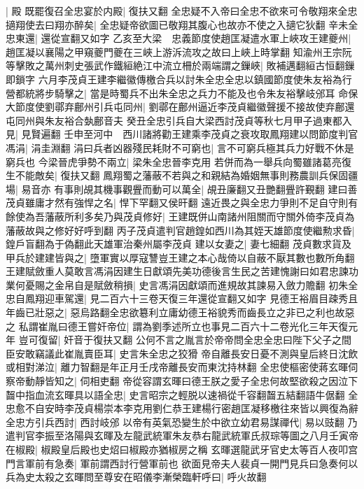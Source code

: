 |{
	殿}
既罷復召全忠宴於内殿|{
	復扶又翻}
全忠疑不入帝曰全忠不欲來可令敬翔來全忠擿翔使去曰翔亦醉矣|{
	全忠疑帝欲圖已敬翔其腹心也故亦不使之入擿它狄翻}
辛未全忠東還|{
	還從宣翻又如字}
乙亥至大梁　忠義節度使趙匡凝遣水軍上峽攻王建夔州|{
	趙匡凝以襄陽之甲窺夔門夔在三峽上游泝流攻之故曰上峽上時掌翻}
知渝州王宗阮等擊敗之萬州刺史張武作鐵絙絶江中流立柵於兩端謂之鏁峽|{
	敗補邁翻絙古恒翻鏁即鎖字}
六月李茂貞王建李繼徽傳檄合兵以討朱全忠全忠以鎮國節度使朱友裕為行營都統將步騎擊之|{
	當是時蜀兵不出朱全忠之兵力不能及也令朱友裕擊岐邠耳}
命保大節度使劉鄩弃鄜州引兵屯同州|{
	劉鄩在鄜州逼近李茂貞繼徽聲援不接故使弃鄜還屯同州與朱友裕合埶鄜音夫}
癸丑全忠引兵自大梁西討茂貞等秋七月甲子過東都入見|{
	見賢遍翻}
壬申至河中　西川諸將勸王建乘李茂貞之衰攻取鳳翔建以問節度判官馮涓|{
	涓圭淵翻}
涓曰兵者凶器殘民耗財不可窮也|{
	言不可窮兵極其兵力好戰不休是窮兵也}
今梁晉虎爭勢不兩立|{
	梁朱全忠晉李克用}
若併而為一舉兵向蜀雖諸葛亮復生不能敵矣|{
	復扶又翻}
鳳翔蜀之藩蔽不若與之和親結為婚姻無事則務農訓兵保固疆場|{
	易音亦}
有事則覘其機事觀舋而動可以萬全|{
	覘丑廉翻又丑艷翻舋許覲翻}
建曰善茂貞雖庸才然有強悍之名|{
	悍下罕翻又侯旰翻}
遠近畏之與全忠力爭則不足自守則有餘使為吾藩蔽所利多矣乃與茂貞修好|{
	王建既併山南諸州阻關而守關外倚李茂貞為藩蔽故與之修好好呼到翻}
丙子茂貞遣判官趙鍠如西川為其姪天雄節度使繼勲求昏|{
	鍠戶盲翻為于偽翻此天雄軍治秦州屬李茂貞}
建以女妻之|{
	妻七細翻}
茂貞數求貨及甲兵於建建皆與之|{
	墮軍實以厚寇讐豈王建之本心哉倚以自蔽不厭其數也數所角翻}
王建賦斂重人莫敢言馮涓因建生日獻頌先美功德後言生民之苦建愧謝曰如君忠諫功業何憂賜之金帛自是賦斂稍損|{
	史言馮涓因獻頌而進規故其諫易入斂力贍翻}
初朱全忠自鳳翔迎車駕還|{
	見二百六十三卷天復三年還從宣翻又如字}
見德王裕眉目疎秀且年齒已壯惡之|{
	惡烏路翻全忠欲簒利立庸幼德王裕貌秀而齒長立之非已之利也故惡之}
私謂崔胤曰德王嘗奸帝位|{
	謂為劉季述所立也事見二百六十二卷光化三年天復元年}
豈可復留|{
	奸音于復扶又翻}
公何不言之胤言於帝帝問全忠全忠曰陛下父子之間臣安敢竊議此崔胤賣臣耳|{
	史言朱全忠之狡猾}
帝自離長安日憂不測與皇后終日沈飲或相對涕泣|{
	離力智翻是年正月壬戌帝離長安而東沈持林翻}
全忠使樞密使蔣玄暉伺察帝動靜皆知之|{
	伺相吏翻}
帝從容謂玄暉曰德王朕之愛子全忠何故堅欲殺之因泣下齧中指血流玄暉具以語全忠|{
	史言昭宗之輕脱以速禍從千容翻齧五結翻語牛倨翻}
全忠愈不自安時李茂貞楊崇本李克用劉仁恭王建楊行密趙匡凝移檄往來皆以興復為辭全忠方引兵西討|{
	西討岐邠}
以帝有英氣恐變生於中欲立幼君易謀禪代|{
	易以豉翻}
乃遣判官李振至洛陽與玄暉及左龍武統軍朱友恭右龍武統軍氏叔琮等圖之八月壬寅帝在椒殿|{
	椒殿皇后殿也史炤曰椒殿亦猶椒房之稱}
玄暉選龍武牙官史太等百人夜叩宫門言軍前有急奏|{
	軍前謂西討行營軍前也}
欲面見帝夫人裴貞一開門見兵曰急奏何以兵為史太殺之玄暉問至尊安在昭儀李漸榮臨軒呼曰|{
	呼火故翻}
